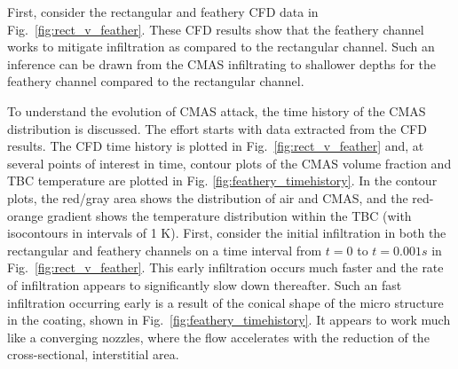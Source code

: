 \documentclass{UCF_ETD}
\begin{document}
First, consider the rectangular and feathery CFD data in Fig.~\ref{fig:rect_v_feather}.
These CFD results show that the feathery channel works to mitigate infiltration as compared to the rectangular channel. Such an inference can be drawn from the CMAS infiltrating to shallower depths for the feathery channel compared to the rectangular channel. 


To understand the evolution of CMAS attack, the time history of the CMAS distribution is discussed. 
The effort starts with data extracted from the CFD results. The CFD time history is plotted in Fig.~\ref{fig:rect_v_feather} and, at several points of interest in time, contour plots of the CMAS volume fraction and TBC temperature are plotted in Fig. \ref{fig:feathery_timehistory}. In the contour plots, the red/gray area shows the distribution of air and CMAS, and the red-orange gradient shows the temperature distribution within the TBC (with isocontours in intervals of 1 K). First, consider the initial infiltration in both the rectangular and feathery channels on a time interval from $t=0$ to $t=0.001 s$ in Fig.~\ref{fig:rect_v_feather}.
This early infiltration occurs much faster and the rate of infiltration appears to significantly slow down thereafter. 
Such an fast infiltration occurring early is a result of the conical shape of the micro structure in the coating, shown in Fig.~\ref{fig:feathery_timehistory}. It appears to work much like a converging nozzles, where the flow accelerates with the reduction of the cross-sectional, interstitial area. 
\end{document}
